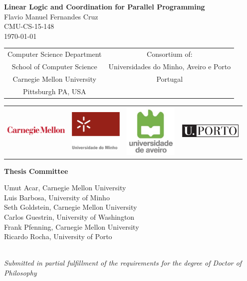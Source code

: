 
\begin{center}
{\huge \bf 
   Linear Logic and Coordination for Parallel Programming
}
\vspace{.25in}
{\LARGE
\\Flavio Manuel Fernandes Cruz\\}
\vspace{.25in}
{\large 
  CMU-CS-15-148
\\ \today \\}
 \vspace{.5in}

\setlength{\tabcolsep}{2em}
{\large
\begin{tabular}{cc}
\\ Computer Science Department & Consortium of:   \\
School of Computer Science & Universidades do Minho,  Aveiro e Porto \\
Carnegie Mellon University & Portugal \\
Pittsburgh PA, USA &  \\
\end{tabular}
}

\begin{tabular}{cccc}
\\ \includegraphics[width=1.2in]{logos/cmu.eps} & \includegraphics[width=1.0in]{logos/um.jpg}  & \includegraphics[width=1.0in]{logos/ua.jpg} & \includegraphics[width=1.2in]{logos/up.eps} \\
\end{tabular}

\vspace{0.3in}

{\bf Thesis Committee \\}

Umut Acar, Carnegie Mellon University\\
Luis Barbosa, University of Minho\\
Seth Goldstein, Carnegie Mellon University\\
Carlos Guestrin, University of Washington\\
Frank Pfenning, Carnegie Mellon University\\
Ricardo Rocha, University of Porto\\\
\vspace{0.4in}

\emph{Submitted in partial fulfillment of the requirements for the degree of Doctor of Philosophy}

\end{center}
